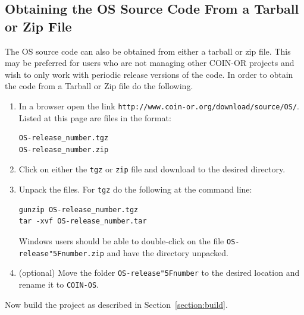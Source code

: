 \documentclass[11pt]{article}
\renewcommand{\_}{{\char"5F}}
\renewcommand{\{}{{\char"7B}}
\renewcommand{\}}{{\char"7D}}
\renewcommand{\^}{{\char"0D}}
\renewcommand{\'}{{\char"0D}}
\newcommand{\UrlOsTarball}{http://www.coin-or.org/download/source/OS/}
\begin{document}
\subsection{Obtaining the OS Source Code From a Tarball or Zip File}\label{section:getTarBalls}

The OS source code can also be obtained from either a  tarball or
zip file.  This may be preferred for users who are not managing other
COIN-OR projects and wish to only work with periodic release versions of the code.  In order to obtain the code
from a Tarball or Zip file do the following.

\vskip 8pt

\begin{enumerate}[{\bf Step 1:}]

\item{}
In a browser open the link {\tt\UrlOsTarball}.  Listed at this page are files in the format:

\begin{verbatim}
OS-release_number.tgz
OS-release_number.zip
\end{verbatim}

\vskip 8pt

\item{}
Click on either the {\tt tgz} or {\tt zip} file and download to the desired directory.

\vskip 8pt

\item{}
Unpack the files. For {\tt tgz} do the following at the command line:
\begin{verbatim}
gunzip OS-release_number.tgz
tar -xvf OS-release_number.tar
\end{verbatim}

Windows users should be  able to double-click on the file {\tt OS-release\_number.zip} and have the directory unpacked.

\vskip 8pt

\item{}
(optional) Move the folder {\tt OS-release\_number} to the desired location and rename it to {\tt COIN-OS}.
\end{enumerate}


Now build the project as described in  Section~\ref{section:build}.
\end{document}
